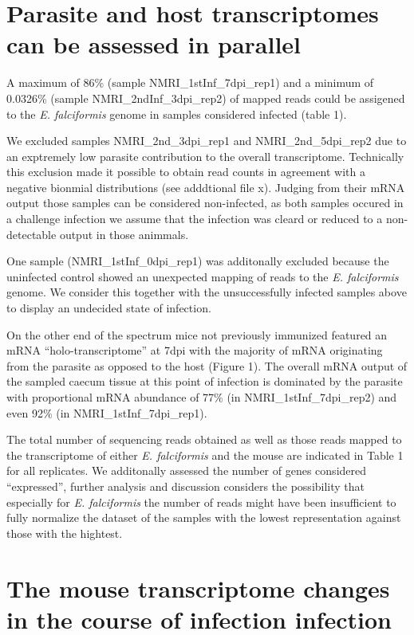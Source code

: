 \documentclass{bmcart}
\begin{document}
\section*{Parasite and host transcriptomes can be assessed in parallel}

A maximum of 86\% (sample NMRI\_1stInf\_7dpi\_rep1) and a minimum of
0.0326\% (sample NMRI\_2ndInf\_3dpi\_rep2) of mapped reads could be
assigened to the \textit{E. falciformis} genome in samples considered
infected (table 1).

We excluded samples NMRI\_2nd\_3dpi\_rep1 and NMRI\_2nd\_5dpi\_rep2
due to an exptremely low parasite contribution to the overall
transcriptome. Technically this exclusion made it possible to obtain
read counts in agreement with a negative bionmial distributions (see
adddtional file x). Judging from their mRNA output those samples can
be considered non-infected, as both samples occured in a challenge
infection we assume that the infection was cleard or reduced to a
non-detectable output in those animmals.

One sample (NMRI\_1stInf\_0dpi\_rep1) was additonally excluded because
the uninfected control showed an unexpected mapping of reads to the
\textit{E. falciformis} genome. We consider this together with the
unsuccessfully infected samples above to display an undecided state of
infection.

On the other end of the spectrum mice not previously immunized
featured an mRNA ``holo-transcriptome'' at 7dpi with the majority of
mRNA originating from the parasite as opposed to the host (Figure
1). The overall mRNA output of the sampled caecum tissue at this point
of infection is dominated by the parasite with proportional mRNA
abundance of 77\% (in NMRI\_1stInf\_7dpi\_rep2) and even 92\% (in
NMRI\_1stInf\_7dpi\_rep1).

The total number of sequencing reads obtained as well as those reads
mapped to the transcriptome of either \textit{E. falciformis} and the
mouse are indicated in Table 1 for all replicates. We additonally
assessed the number of genes considered ``expressed'', further
analysis and discussion considers the possibility that especially for
\textit{E. falciformis} the number of reads might have been
insufficient to fully normalize the dataset of the samples with the
lowest representation against those with the hightest.

\section*{The mouse transcriptome changes in the course of infection infection}
\end{document}
